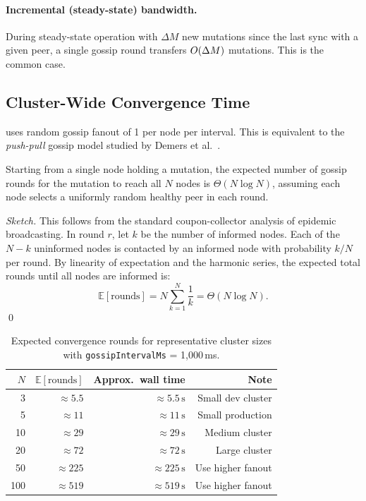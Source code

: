 \paragraph{Incremental (steady-state) bandwidth.}
During steady-state operation with $\Delta M$ new mutations since the last sync
with a given peer, a single gossip round transfers $O\!\left(\Delta M\right)$ mutations.
This is the common case.

\subsection{Cluster-Wide Convergence Time}

\pebble{} uses random gossip fanout of 1 per node per interval. This is
equivalent to the \emph{push-pull} gossip model studied by Demers et
al.~\cite{demers1987epidemic}.

\begin{theorem}
\label{thm:convergence-time}
Starting from a single node holding a mutation, the expected number of gossip
rounds for the mutation to reach all $N$ nodes is $\Theta(N \log N)$, assuming
each node selects a uniformly random healthy peer in each round.
\end{theorem}

\begin{proof}[Sketch]
This follows from the standard coupon-collector analysis of epidemic
broadcasting. In round $r$, let $k$ be the number of informed nodes. Each of
the $N - k$ uninformed nodes is contacted by an informed node with probability
$k/N$ per round. By linearity of expectation and the harmonic series, the
expected total rounds until all nodes are informed is:
\[
  \mathbb{E}[\text{rounds}] = N \sum_{k=1}^{N} \frac{1}{k} = \Theta(N \log N).
\]
\qed
\end{proof}

\begin{table}[H]
\centering
\caption{Expected convergence rounds for representative cluster sizes
with \texttt{gossipIntervalMs} = 1{,}000\,ms.}
\label{tab:convergence-table}
\begin{tabular}{@{}rrrr@{}}
\toprule
$N$ & $\mathbb{E}[\text{rounds}]$ & \textbf{Approx.\ wall time} & \textbf{Note} \\
\midrule
3   & $\approx 5.5$ & $\approx 5.5\,\text{s}$  & Small dev cluster \\
5   & $\approx 11$  & $\approx 11\,\text{s}$   & Small production \\
10  & $\approx 29$  & $\approx 29\,\text{s}$   & Medium cluster \\
20  & $\approx 72$  & $\approx 72\,\text{s}$   & Large cluster \\
50  & $\approx 225$ & $\approx 225\,\text{s}$  & Use higher fanout \\
100 & $\approx 519$ & $\approx 519\,\text{s}$  & Use higher fanout \\
\bottomrule
\end{tabular}
\end{table}

